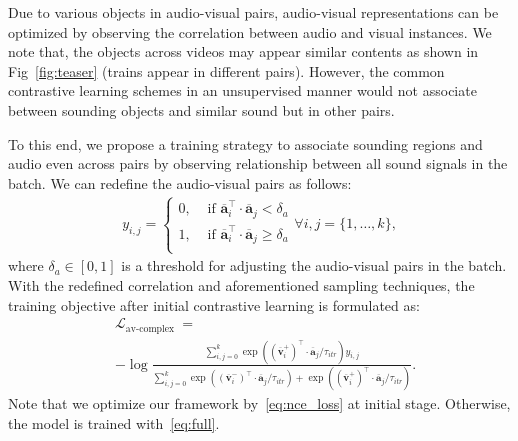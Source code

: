 Due to various objects in audio-visual pairs, audio-visual representations can be optimized by observing the correlation between audio and visual instances. %
We note that, the objects across videos may appear similar contents as shown in Fig~\ref{fig:teaser} (\eg trains appear in different pairs).
% 
However, the common contrastive learning schemes in an unsupervised manner would not associate between sounding objects and similar sound but in other pairs. 
% 

To this end, we propose a training strategy to associate sounding regions and audio even across pairs by observing relationship between all sound signals in the batch. 
% 
We can redefine the audio-visual pairs as follows:
\begin{equation}
\begin{aligned}
\label{eq:a_th}
y_{i,j}=\left\{\begin{array}{ll}
0, & \text { if } \overline{\mathbf{a}}_{i}^{\top} \cdot \overline{\mathbf{a}}_{j} < \delta_{a} \\
1, & \text { if } \overline{\mathbf{a}}_{i}^{\top} \cdot \overline{\mathbf{a}}_{j} \geq \delta_{a}\\
\end{array}\right. 
\forall i, j=\{1, \ldots,k\},
\end{aligned}
\end{equation}
where $\delta_{a} \in [0,1]$ is a threshold for adjusting the audio-visual pairs in the batch. With the redefined correlation and aforementioned sampling techniques, the training objective after initial contrastive learning is formulated as:
\begin{equation}
\label{eq:full}
\begin{aligned}
&\mathcal{L}_{\text {av-complex }}= \\ &-\log
\frac{\sum_{i,j=0}^{k} \exp ( (\overline{\mathbf{v}}_{i}^{+})^{\top} \cdot \overline{\mathbf{a}}_{j} / \tau_{itr}) y_{i,j}}
{\sum_{i,j=0}^{k} \exp ((\overline{\mathbf{v}}_{i}^{-})^{\top} \cdot \overline{\mathbf{a}}_{j} / \tau_{itr})
+ \exp ((\overline{\mathbf{v}}_{i}^{+})^{\top} \cdot \overline{\mathbf{a}}_{j} / \tau_{itr})
}.
\end{aligned}
\end{equation}
Note that we optimize our framework by~\eqref{eq:nce_loss} at initial stage. Otherwise, the model is trained with~\eqref{eq:full}.


 